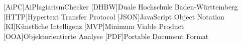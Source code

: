 \addchap*{\langacronyms}
\begin{acronym}
  [AiPC]{AiPlagiarismChecker}
  [DHBW]{Duale Hochschule Ba\-den-\-Würt\-tem\-berg}
  [HTTP]{Hypertext Transfer Protocol}
  [JSON]{JavaScript Object Notation}
  [KI]{Künstliche Intelligenz}
  [MVP]{Minimum Viable Product}
  [OOA]{Objektorientierte Analyse}
  [PDF]{Portable Document Format}
\end{acronym}